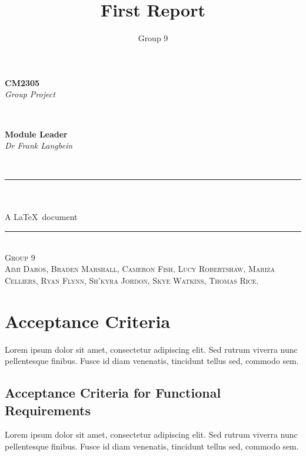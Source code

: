 \documentclass[a4paper, 12pt, titlepage]{article}
\title{First Report}
\author{Group 9}
\newcommand{\makeColourful}{\color{MidnightBlue}}
\begin{document}
\begin{titlepage}
\newcommand{\HRule}{\rule{\linewidth}{1.5mm}}
\center

\begin{minipage}{0.4\textwidth}
\begin{flushleft}
\textbf{\large CM2305}
\\
\emph{\large Group Project}
\end{flushleft}
\end{minipage}
~
\begin{minipage}{0.4\textwidth}
\begin{flushright}
\textbf{\large Module Leader}
\\
\emph{\large Dr Frank Langbein} 
\end{flushright}
\end{minipage}
\\[2cm]

{\makeColourful \HRule} 
\\[2cm]
{\fontsize{90pt}{0pt}\selectfont \makeColourful{\textsc{First Report}}}
\\[1.5cm]
A \LaTeX\ document
{\makeColourful \HRule}
\\[6cm]

\textsc{\Large Group 9}
\\[0.5cm] 
\textsc{Aimi Daros, Braden Marshall, Cameron Fish, Lucy Robertshaw, Mariza Celliers, Ryan Flynn, Sh’kyra Jordon, Skye Watkins, Thomas Rice.}

\end{titlepage}

\newpage
\tableofcontents
\newpage




\section{Acceptance Criteria}
Lorem ipsum dolor sit amet, consectetur adipiscing elit. Sed rutrum viverra nunc pellentesque finibus. Fusce id diam venenatis, tincidunt tellus sed, commodo sem.

\subsection*{Acceptance Criteria for Functional Requirements}
Lorem ipsum dolor sit amet, consectetur adipiscing elit. Sed rutrum viverra nunc pellentesque finibus. Fusce id diam venenatis, tincidunt tellus sed, commodo sem.
\end{document}
